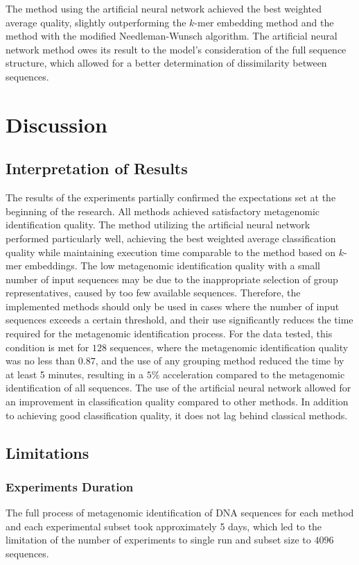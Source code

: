 \documentclass[pdflatex,sn-vancouver-num]{sn-jnl}%
\begin{document}
                The method using the artificial neural network achieved the best weighted average quality, slightly outperforming the $k$-mer embedding method and the method with the modified Needleman-Wunsch algorithm. The artificial neural network method owes its result to the model's consideration of the full sequence structure, which allowed for a better determination of dissimilarity between sequences.

    \section{Discussion}
        \subsection{Interpretation of Results}
            The results of the experiments partially confirmed the expectations set at the beginning of the research. All methods achieved satisfactory metagenomic identification quality. The method utilizing the artificial neural network performed particularly well, achieving the best weighted average classification quality while maintaining execution time comparable to the method based on $k$-mer embeddings. The low metagenomic identification quality with a small number of input sequences may be due to the inappropriate selection of group representatives, caused by too few available sequences. Therefore, the implemented methods should only be used in cases where the number of input sequences exceeds a certain threshold, and their use significantly reduces the time required for the metagenomic identification process. For the data tested, this condition is met for $128$ sequences, where the metagenomic identification quality was no less than $0.87$, and the use of any grouping method reduced the time by at least 5 minutes, resulting in a $5\%$ acceleration compared to the metagenomic identification of all sequences. The use of the artificial neural network allowed for an improvement in classification quality compared to other methods. In addition to achieving good classification quality, it does not lag behind classical methods.

        \subsection{Limitations}
            \subsubsection{Experiments Duration}
                The full process of metagenomic identification of DNA sequences for each method and each experimental subset took approximately 5 days, which led to the limitation of the number of experiments to single run and subset size to $4096$ sequences.
\end{document}
